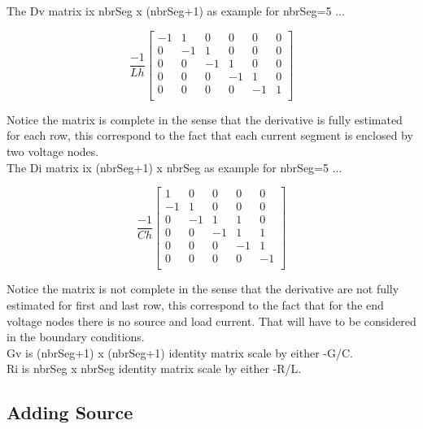 \documentclass[12pt, letterpaper]{article}
\begin{document}
The Dv matrix ix nbrSeg x (nbrSeg+1) as example for nbrSeg=5 ...

\begin{equation}
	\frac{-1}{L h}
	\begin{bmatrix}
	   -1 &  1 & 0 & 0 & 0 &0 \\
	    0 & -1 & 1 & 0 & 0 &0 \\
	    0 &  0 & -1 & 1 & 0 &0 \\
	    0 &  0 & 0 & -1 & 1 & 0 \\
	    0 &  0 & 0& 0 & -1 & 1  \\
	   
	\end{bmatrix}
\end{equation}

Notice the matrix is complete in the sense that the derivative is fully estimated for each row, this correspond to the fact that each current segment is enclosed by two voltage nodes.\\

The Di matrix ix (nbrSeg+1) x nbrSeg as example for nbrSeg=5 ...

\begin{equation}
	\frac{-1}{C h}
	\begin{bmatrix}
		 1 &  0 &  0 &  0 &  0  \\
		-1 &  1 &  0 &  0 &  0  \\
		 0 & -1 &  1 &  1 &  0  \\
		 0 &  0 & -1 &  1 &  1  \\
		 0 &  0 &  0 & -1 &  1  \\
		 0 &  0 &  0 &  0 & -1   \\
	\end{bmatrix}
\end{equation}

Notice the matrix is not complete in the sense that the derivative are not fully estimated for first and last row, this correspond to the fact that for the end voltage nodes there is no source and load current. That will have to be considered in the boundary conditions.\\

Gv is (nbrSeg+1) x (nbrSeg+1) identity matrix scale by either -G/C.\\

Ri is nbrSeg x nbrSeg identity matrix scale by either -R/L.\\

\subsection{Adding Source}
\end{document}
